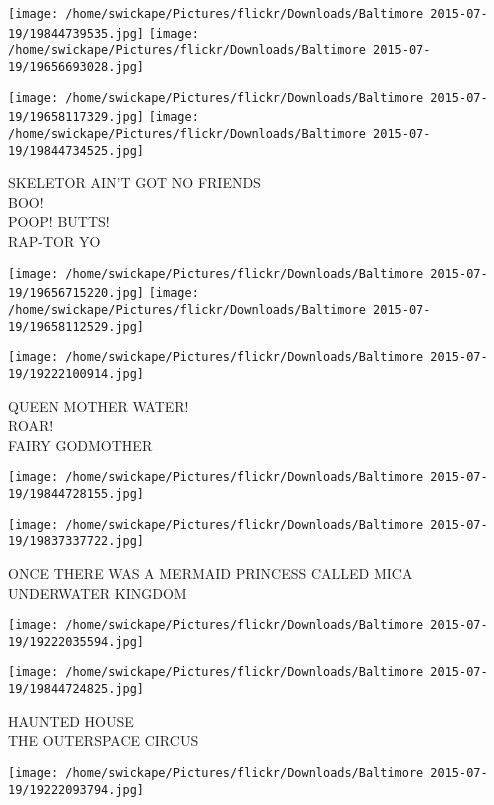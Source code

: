 \documentclass[10pt,letterpaper]{article}
\begin{document}
\texttt{[image: /home/swickape/Pictures/flickr/Downloads/Baltimore 2015-07-19/19844739535.jpg]}
\texttt{[image: /home/swickape/Pictures/flickr/Downloads/Baltimore 2015-07-19/19656693028.jpg]}

\texttt{[image: /home/swickape/Pictures/flickr/Downloads/Baltimore 2015-07-19/19658117329.jpg]}
\texttt{[image: /home/swickape/Pictures/flickr/Downloads/Baltimore 2015-07-19/19844734525.jpg]}

SKELETOR AIN'T GOT NO FRIENDS\\
BOO!\\
POOP!  BUTTS!\\
RAP{-}TOR YO
\pagebreak

\texttt{[image: /home/swickape/Pictures/flickr/Downloads/Baltimore 2015-07-19/19656715220.jpg]}
\texttt{[image: /home/swickape/Pictures/flickr/Downloads/Baltimore 2015-07-19/19658112529.jpg]}

\vspace{0.25in}
\texttt{[image: /home/swickape/Pictures/flickr/Downloads/Baltimore 2015-07-19/19222100914.jpg]}

QUEEN MOTHER WATER!\\
ROAR!\\
FAIRY GODMOTHER
\pagebreak

\texttt{[image: /home/swickape/Pictures/flickr/Downloads/Baltimore 2015-07-19/19844728155.jpg]}

\vspace{0.25in}
\texttt{[image: /home/swickape/Pictures/flickr/Downloads/Baltimore 2015-07-19/19837337722.jpg]}

ONCE THERE WAS A MERMAID PRINCESS CALLED MICA\\
UNDERWATER KINGDOM
\pagebreak

\texttt{[image: /home/swickape/Pictures/flickr/Downloads/Baltimore 2015-07-19/19222035594.jpg]}

\vspace{0.25in}
\texttt{[image: /home/swickape/Pictures/flickr/Downloads/Baltimore 2015-07-19/19844724825.jpg]}

HAUNTED HOUSE\\
THE OUTERSPACE CIRCUS
\pagebreak

\texttt{[image: /home/swickape/Pictures/flickr/Downloads/Baltimore 2015-07-19/19222093794.jpg]}
\end{document}
